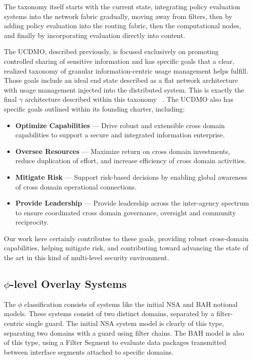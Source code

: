 The taxonomy itself starts with the current state, integrating policy evaluation systems into the network fabric gradually, moving away from filters, then by adding policy evaluation into the routing fabric, then the computational nodes, and finally by incorporating evaluation directly into content.

The UCDMO, described previously, is focused exclusively on promoting controlled sharing of sensitive information and has specific goals that a clear, realized taxonomy of granular information-centric usage management helps fulfill.  Those goals include an ideal end state described as a flat network architecture with usage management injected into the distributed system.  This is exactly the final $\gamma$ architecture described within this taxonomy ~\cite{proposal:cd101,proposal:ucdmo-goals}.  The UCDMO also has specific goals outlined within its founding charter, including:

\begin{itemize}
\item \textbf{Optimize Capabilities} ---  Drive robust and extensible cross domain capabilities to support a secure and integrated information enterprise.
\item \textbf{Oversee Resources} ---  Maximize return on cross domain investments, reduce duplication of effort, and increase efficiency of cross domain activities.
\item \textbf{Mitigate Risk} ---  Support risk-based decisions by enabling global awareness of cross domain operational connections.
\item \textbf{Provide Leadership} ---  Provide leadership across the inter-agency spectrum to ensure coordinated cross domain governance, oversight and community reciprocity.
\end{itemize}

Our work here certainly contributes to these goals, providing robust cross-domain capabilities, helping mitigate risk, and contributing toward advancing the state of the art in this kind of multi-level security environment.

\subsection{$\phi$-level Overlay Systems}
The $\phi$ classification consists of systems like the initial NSA and BAH notional models.  These systems consist of two distinct domains, separated by a filter-centric single guard.  The initial NSA system model is clearly of this type, separating two domains with a guard using filter chains.  The BAH model is also of this type, using a Filter Segment to evaluate data packages transmitted between interface segments attached to specific domains.


